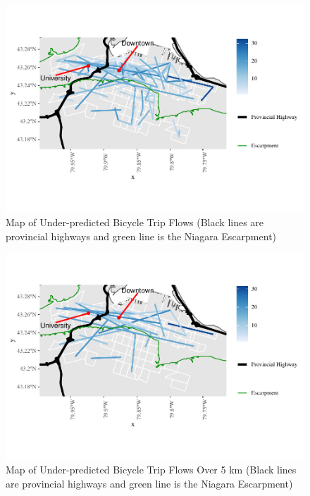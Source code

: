 \documentclass[smallextended]{svjour3}       %
\begin{document}
\begin{figure}
\centering
\includegraphics{Correlates-cycling-flows-routes_files/figure-latex/residuals-under-1.pdf}
\caption{\label{fig:residuals-underestimated} Map of Under-predicted
Bicycle Trip Flows (Black lines are provincial highways and green line
is the Niagara Escarpment)}
\end{figure}

\begin{figure}
\centering
\includegraphics{Correlates-cycling-flows-routes_files/figure-latex/residuals-over-5km-1.pdf}
\caption{\label{fig:residuals-over-5km} Map of Under-predicted Bicycle
Trip Flows Over 5 km (Black lines are provincial highways and green line
is the Niagara Escarpment)}
\end{figure}
\end{document}
